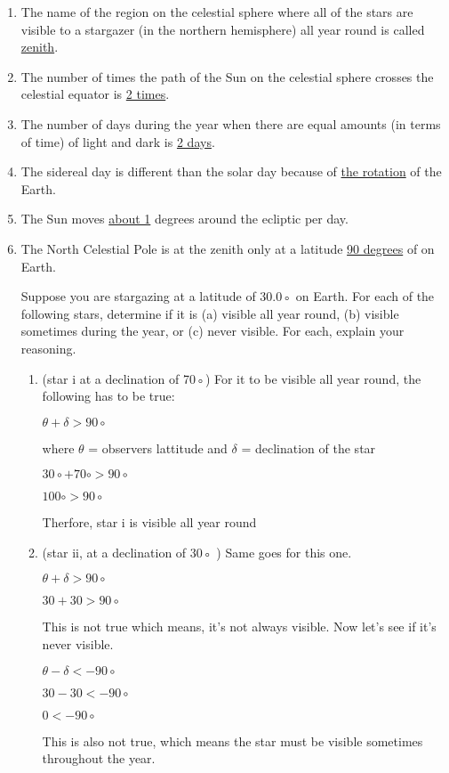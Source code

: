 \documentclass[12pt]{article}
\begin{document}
\begin{enumerate}
        \item The name of the region on the celestial sphere where all of the stars are visible to a stargazer (in the northern hemisphere) all year round is called \underline{zenith}.

        \item The number of times the path of the Sun on the celestial sphere crosses
the celestial equator is \underline{2 times}.

        \item The number of days during the year when there are equal amounts (in
terms of time) of light and dark is \underline{2 days}.

        \item The sidereal day is different than the solar day because of \underline{the rotation} of the Earth.

        \item The Sun moves \underline{about 1} degrees around the ecliptic per day.

        \item The North Celestial Pole is at the zenith only at a latitude \underline{90 degrees} of on Earth.


        Suppose you are stargazing at a latitude of 30.0◦ on Earth. For each of
the following stars, determine if it is (a) visible all year round, (b) visible
sometimes during the year, or (c) never visible. For each, explain your reasoning.
\begin{enumerate}
        \item (star i at a declination of 70◦)\newline\newline
        For it to be visible all year round, the following has to be true:\newline
        \centerline{$\theta + \delta  > 90\circ$}
        where $\theta$ = observers lattitude and $\delta$ = declination of the star
        \centerline{$30\circ + 70\circ > 90\circ$}
        \centerline{$ 100\circ > 90\circ$}
        Therfore, star i is visible all year round\newline

        \item (star ii, at a declination of 30◦ )\newline
        Same goes for this one.
        \centerline{$\theta + \delta > 90\circ$}
        \centerline{$30 + 30 > 90\circ$}
        This is not true which means, it's not always visible.\newline
        Now let's see if it's never visible.
        \centerline{$\theta - \delta < -90\circ$}
        \centerline{$30 - 30 < -90\circ$}
        \centerline{$0 < -90\circ$}
        This is also not true, which means the star must be visible sometimes throughout the year.\newline


\end{enumerate}
\end{enumerate}
\end{document}
